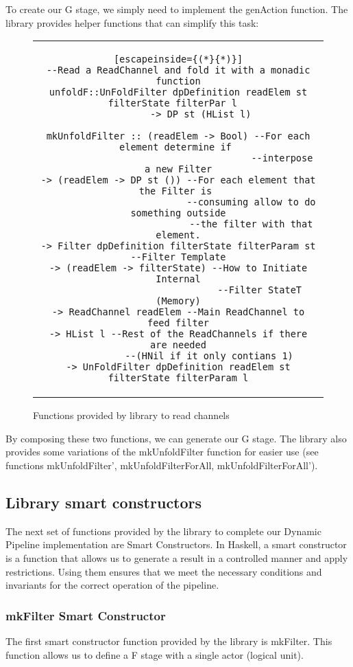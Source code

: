 To create our G stage, we simply need to implement the genAction function.
The library provides helper functions that can simplify this task:

\begin{figure}[H]
    \begin{tabular}{c}
        \begin{lstlisting}[escapeinside={(*}{*)}]
--Read a ReadChannel and fold it with a monadic function
unfoldF::UnFoldFilter dpDefinition readElem st filterState filterPar l	
        -> DP st (HList l)

mkUnfoldFilter :: (readElem -> Bool) --For each element determine if 
                                     --interpose a new Filter
-> (readElem -> DP st ()) --For each element that the Filter is 
                          --consuming allow to do something outside
                          --the filter with that element.
-> Filter dpDefinition filterState filterParam st   --Filter Template
-> (readElem -> filterState) --How to Initiate Internal
                             --Filter StateT (Memory)
-> ReadChannel readElem --Main ReadChannel to feed filter
-> HList l --Rest of the ReadChannels if there are needed
           --(HNil if it only contians 1)
-> UnFoldFilter dpDefinition readElem st filterState filterParam l
        \end{lstlisting}
    \end{tabular}
    \caption{Functions provided by library to read channels}
    \label{fig:HC8}
\end{figure}
By composing these two functions, we can generate our G stage.
The library also provides some variations of the mkUnfoldFilter function for easier use (see functions mkUnfoldFilter', mkUnfoldFilterForAll, mkUnfoldFilterForAll').
\subsection{Library smart constructors}
The next set of functions provided by the library to complete our Dynamic Pipeline implementation are Smart Constructors.
In Haskell, a smart constructor is a function that allows us to generate a result in a controlled manner and apply restrictions.
Using them ensures that we meet the necessary conditions and invariants for the correct operation of the pipeline.
\subsubsection*{mkFilter Smart Constructor}
The first smart constructor function provided by the library is mkFilter.
This function allows us to define a F stage with a single actor (logical unit).

